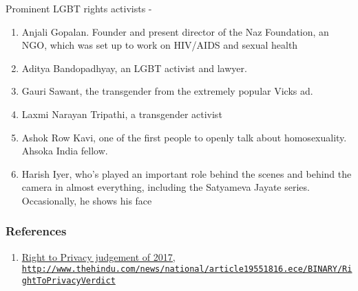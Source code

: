 \documentclass[11pt]{article}
\begin{document}
Prominent LGBT rights activists - 
\begin{enumerate}[noitemsep]
	\item Anjali Gopalan. Founder and present director of the Naz Foundation, an NGO, which was set up to work on HIV/AIDS and sexual health
	\item Aditya Bandopadhyay, an LGBT activist and lawyer.
	\item Gauri Sawant, the transgender from the extremely popular Vicks ad.
	\item Laxmi Narayan Tripathi, a transgender activist
	\item Ashok Row Kavi, one of the first people to openly talk about homosexuality. Ahsoka India fellow.
	\item Harish Iyer, who's played an important role behind the scenes and behind the camera in almost everything, including the Satyameva Jayate series. Occasionally, he shows his face
\end{enumerate}

\subsubsection*{References}
\begin{enumerate}
	\item \href{http://www.thehindu.com/news/national/article19551816.ece/BINARY/RightToPrivacyVerdict}{Right to Privacy judgement of 2017, \lstinline{http://www.thehindu.com/news/national/article19551816.ece/BINARY/RightToPrivacyVerdict}}
\end{enumerate}
\end{document}
